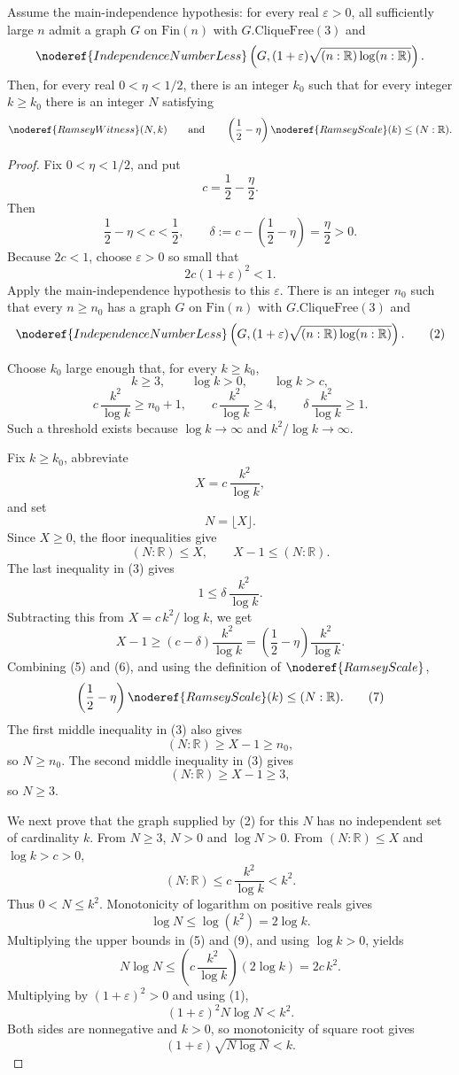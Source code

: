 \begin{lemma}
Assume the main-independence hypothesis: for every real \(\varepsilon>0\), all
sufficiently large \(n\) admit a graph \(G\) on \(\mathrm{Fin}(n)\) with
\(G.\mathrm{CliqueFree}(3)\) and
\[
\noderef{IndependenceNumberLess}
\left(G,(1+\varepsilon)\sqrt{(n:\mathbb R)\log(n:\mathbb R)}\right).
\]
Then, for every real \(0<\eta<1/2\), there is an integer \(k_0\) such that for
every integer \(k\ge k_0\) there is an integer \(N\) satisfying
\[
\noderef{RamseyWitness}(N,k)
\qquad\text{and}\qquad
\left(\frac12-\eta\right)\noderef{RamseyScale}(k)\le (N:\mathbb R).
\]
\end{lemma}
\begin{proof}
Fix \(0<\eta<1/2\), and put
\[
c=\frac12-\frac{\eta}{2}.
\]
Then
\[
\frac12-\eta<c<\frac12,\qquad
\delta:=c-\left(\frac12-\eta\right)=\frac{\eta}{2}>0.
\]
Because \(2c<1\), choose \(\varepsilon>0\) so small that
\[
2c(1+\varepsilon)^2<1. \tag{1}
\]
Apply the main-independence hypothesis to this \(\varepsilon\).  There is an
integer \(n_0\) such that every \(n\ge n_0\) has a graph \(G\) on
\(\mathrm{Fin}(n)\) with \(G.\mathrm{CliqueFree}(3)\) and
\[
\noderef{IndependenceNumberLess}
\left(G,(1+\varepsilon)\sqrt{(n:\mathbb R)\log(n:\mathbb R)}\right). \tag{2}
\]

Choose \(k_0\) large enough that, for every \(k\ge k_0\),
\[
k\ge3,\qquad \log k>0,\qquad \log k>c,
\]
\[
c\,\frac{k^2}{\log k}\ge n_0+1,\qquad
c\,\frac{k^2}{\log k}\ge4,\qquad
\delta\,\frac{k^2}{\log k}\ge1. \tag{3}
\]
Such a threshold exists because \(\log k\to\infty\) and
\(k^2/\log k\to\infty\).

Fix \(k\ge k_0\), abbreviate
\[
X=c\,\frac{k^2}{\log k},
\]
and set
\[
N=\lfloor X\rfloor. \tag{4}
\]
Since \(X\ge0\), the floor inequalities give
\[
(N:\mathbb R)\le X,\qquad X-1\le (N:\mathbb R). \tag{5}
\]
The last inequality in (3) gives
\[
1\le \delta\,\frac{k^2}{\log k}.
\]
Subtracting this from \(X=c\,k^2/\log k\), we get
\[
X-1\ge
\left(c-\delta\right)\frac{k^2}{\log k}
=\left(\frac12-\eta\right)\frac{k^2}{\log k}. \tag{6}
\]
Combining (5) and (6), and using the definition of \(\noderef{RamseyScale}\),
\[
\left(\frac12-\eta\right)\noderef{RamseyScale}(k)\le (N:\mathbb R). \tag{7}
\]
The first middle inequality in (3) also gives
\[
(N:\mathbb R)\ge X-1\ge n_0,
\]
so \(N\ge n_0\).  The second middle inequality in (3) gives
\[
(N:\mathbb R)\ge X-1\ge3,
\]
so \(N\ge3\).

We next prove that the graph supplied by (2) for this \(N\) has no independent
set of cardinality \(k\).  From \(N\ge3\), \(N>0\) and \(\log N>0\).  From
\((N:\mathbb R)\le X\) and \(\log k>c>0\),
\[
(N:\mathbb R)\le c\,\frac{k^2}{\log k}<k^2. \tag{8}
\]
Thus \(0<N\le k^2\).  Monotonicity of logarithm on positive reals gives
\[
\log N\le \log(k^2)=2\log k. \tag{9}
\]
Multiplying the upper bounds in (5) and (9), and using \(\log k>0\), yields
\[
N\log N\le
\left(c\,\frac{k^2}{\log k}\right)(2\log k)=2c\,k^2. \tag{10}
\]
Multiplying by \((1+\varepsilon)^2>0\) and using (1),
\[
(1+\varepsilon)^2N\log N<k^2. \tag{11}
\]
Both sides are nonnegative and \(k>0\), so monotonicity of square root gives
\[
(1+\varepsilon)\sqrt{N\log N}<k. \tag{12}
\]


\end{proof}
